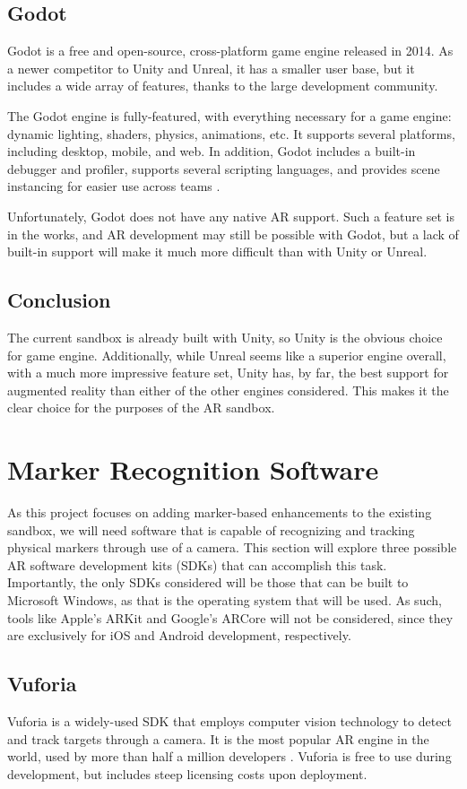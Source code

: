 \documentclass[letterpaper, 10pt, onecolumn, draftclsnofoot]{IEEEtran}
\begin{document}
\subsection{Godot}
Godot is a free and open-source, cross-platform game engine released in 2014. As a newer competitor to Unity and Unreal, it has a smaller user base, but it includes a wide array of features, thanks to the large development community.

The Godot engine is fully-featured, with everything necessary for a game engine: dynamic lighting, shaders, physics, animations, etc. It supports several platforms, including desktop, mobile, and web. In addition, Godot includes a built-in debugger and profiler, supports several scripting languages, and provides scene instancing for easier use across teams \cite{godot-features}.

Unfortunately, Godot does not have any native AR support. Such a feature set is in the works, and AR development may still be possible with Godot, but a lack of built-in support will make it much more difficult than with Unity or Unreal.

\subsection{Conclusion}
The current sandbox is already built with Unity, so Unity is the obvious choice for game engine. Additionally, while Unreal seems like a superior engine overall, with a much more impressive feature set, Unity has, by far, the best support for augmented reality than either of the other engines considered. This makes it the clear choice for the purposes of the AR sandbox.

\section{Marker Recognition Software}
As this project focuses on adding marker-based enhancements to the existing sandbox, we will need software that is capable of recognizing and tracking physical markers through use of a camera. This section will explore three possible AR software development kits (SDKs) that can accomplish this task. Importantly, the only SDKs considered will be those that can be built to Microsoft Windows, as that is the operating system that will be used. As such, tools like Apple's ARKit and Google's ARCore will not be considered, since they are exclusively for iOS and Android development, respectively.

\subsection{Vuforia}
Vuforia is a widely-used SDK that employs computer vision technology to detect and track targets through a camera. It is the most popular AR engine in the world, used by more than half a million developers \cite{vuforia-engine}. Vuforia is free to use during development, but includes steep licensing costs upon deployment. 
\end{document}
